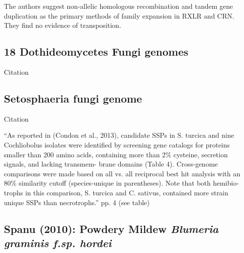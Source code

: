   The authors suggest non-allelic homologous recombination and tandem gene
  duplication as the primary methods of family expansion in RXLR and CRN.  They
  find no evidence of transposition.


\subsection{18 Dothideomycetes Fungi genomes}

  Citation \cite{ohm_diverse_2012}


\subsection{Setosphaeria fungi genome}

  Citation \cite{wu_setosphaeria_2013}


  ``As reported in (Condon et al., 2013), candidate SSPs in S. turcica and
  nine Cochliobolus isolates were identified by screening gene catalogs for
  proteins smaller than 200 amino acids, containing more than 2\% cysteine,
  secretion signals, and lacking transmem- brane domains (Table 4).
  Cross-genome comparisons were made based on all vs. all reciprocal best hit
  analysis with an 80\% similarity cutoff (species-unique in parentheses).
  Note that both hemibio- trophs in this comparison, S. turcica and C.
  sativus, contained more strain unique SSPs than necrotrophs.'' pp. 4 (see
  table)

\subsection{Spanu (2010): Powdery Mildew \textit{ Blumeria graminis f.sp. hordei}}

